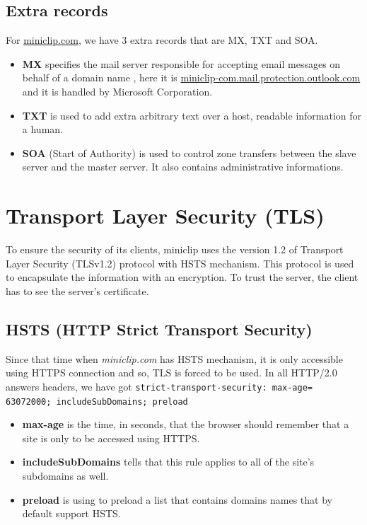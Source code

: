 \documentclass{article}
\begin{document}
\subsection{Extra records}
\label{subsub:extra}

For \url{miniclip.com}, we have 3 extra records that are MX, TXT and SOA.
\begin{itemize}
    \itemsep-0.1em
    \item \textbf{MX} specifies the mail server responsible for accepting email messages on behalf of a domain name \cite{mx}, here it is \url{miniclip-com.mail.protection.outlook.com} and it is handled by Microsoft Corporation. 
    \item \textbf{TXT} is used to add extra arbitrary text over a host, readable information for a human.
    \item \textbf{SOA} (Start of Authority) is used to control zone transfers between the slave server and the master server. It also contains administrative informations.
\end{itemize}



\section{Transport Layer Security (TLS)}
\label{sec:TCP}

To ensure the security of its clients, miniclip uses the version 1.2 of Transport Layer Security (TLSv1.2) protocol with HSTS mechanism. This protocol is used to encapsulate the information with an encryption. To trust the server, the client has to see the server's certificate.


\subsection{HSTS (HTTP Strict Transport Security)}
\label{sub:hsts}

Since that time when \textit{miniclip.com} has HSTS mechanism, it is only accessible using HTTPS connection and so, TLS is forced to be used. In all HTTP/2.0 answers headers, we have got \texttt{strict-transport-security: max-age=
63072000; includeSubDomains; preload}

\begin{itemize}
    \itemsep -0.1em
    \item \textbf{max-age} is the time, in seconds, that the browser should remember that a site is only to be accessed using HTTPS.
    \item \textbf{includeSubDomains} tells that this rule applies to all of the site's subdomains as well.
    \item \textbf{preload} is using to preload a list that contains domains names that by default support HSTS.
\end{itemize}
\end{document}
